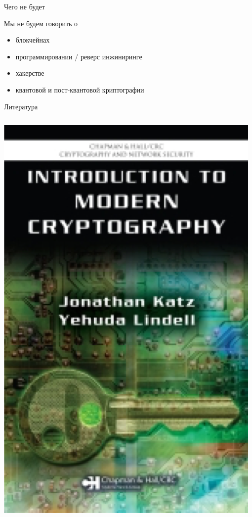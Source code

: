 \documentclass[usenames,dvipsnames,8pt,aspectratio=169]{beamer}
\begin{document}
\begin{frame}{Чего не будет}

\Large

Мы {\color{Orange} не} будем говорить о

\begin{itemize}
	\itemsep 8pt
	\item блокчейнах
	\item программировании / реверс инжиниринге
	\item хакерстве
	\item квантовой и пост-квантовой криптографии
\end{itemize}

\end{frame}

\begin{frame}{Литература}
\Large
\begin{columns}[T]
	\begin{column}{0.5\textwidth}
		\includegraphics[scale=0.25]{katz_lindel_book}

\end{column}
\end{columns}
\end{frame}
\end{document}
